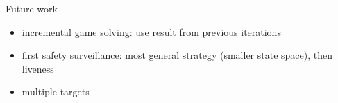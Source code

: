 Future work
\begin{itemize}
\item incremental game solving: use result from previous iterations
\item first safety surveillance: most general strategy (smaller state space), then liveness
\item multiple targets
\end{itemize}